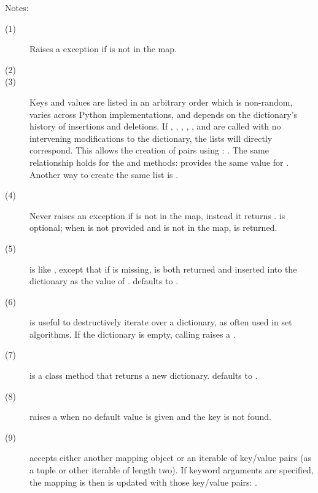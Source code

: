 \noindent
Notes:
\begin{description}
\item[(1)] Raises a  exception if  is not
in the map.

\item[(2)] 

\item[(3)] Keys and values are listed in an arbitrary order which is
non-random, varies across Python implementations, and depends on the
dictionary's history of insertions and deletions.
If , , ,
, , and 
are called with no intervening modifications to the dictionary, the
lists will directly correspond.  This allows the creation of
 pairs using :
.  The same
relationship holds for the  and
 methods:  provides the same value for .
Another way to create the same list is .

\item[(4)] Never raises an exception if  is not in the map,
instead it returns .   is optional; when  is not
provided and  is not in the map,  is returned.

\item[(5)]  is like , except
that if  is missing,  is both returned and inserted into
the dictionary as the value of .  defaults to .

\item[(6)]  is useful to destructively iterate
over a dictionary, as often used in set algorithms.  If the dictionary
is empty, calling  raises a .

\item[(7)]  is a class method that returns a
new dictionary.  defaults to .  

\item[(8)]  raises a  when no default
value is given and the key is not found.  

\item[(9)]  accepts either another mapping object
or an iterable of key/value pairs (as a tuple or other iterable of
length two).  If keyword arguments are specified, the mapping is
then is updated with those key/value pairs:
.

\end{description}

